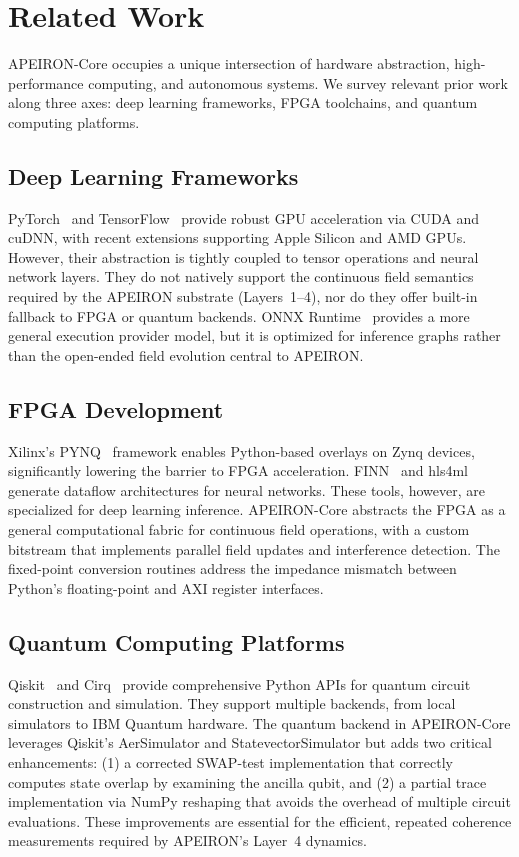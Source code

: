 \newpage
\section{Related Work}

APEIRON-Core occupies a unique intersection of hardware abstraction, high-performance computing, and autonomous systems. We survey relevant prior work along three axes: deep learning frameworks, FPGA toolchains, and quantum computing platforms.

\subsection{Deep Learning Frameworks}
PyTorch~\cite{paszke2019pytorch} and TensorFlow~\cite{abadi2016tensorflow} provide robust GPU acceleration via CUDA and cuDNN, with recent extensions supporting Apple Silicon and AMD GPUs. However, their abstraction is tightly coupled to tensor operations and neural network layers. They do not natively support the continuous field semantics required by the APEIRON substrate (Layers~1–4), nor do they offer built-in fallback to FPGA or quantum backends. ONNX Runtime~\cite{onnxruntime2024} provides a more general execution provider model, but it is optimized for inference graphs rather than the open-ended field evolution central to APEIRON.

\subsection{FPGA Development}
Xilinx's PYNQ~\cite{pynq2024} framework enables Python-based overlays on Zynq devices, significantly lowering the barrier to FPGA acceleration. FINN~\cite{blott2018finn} and hls4ml~\cite{duarte2018hls4ml} generate dataflow architectures for neural networks. These tools, however, are specialized for deep learning inference. APEIRON-Core abstracts the FPGA as a general computational fabric for continuous field operations, with a custom bitstream that implements parallel field updates and interference detection. The fixed-point conversion routines address the impedance mismatch between Python's floating-point and AXI register interfaces.

\subsection{Quantum Computing Platforms}
Qiskit~\cite{qiskit2023} and Cirq~\cite{cirq2024} provide comprehensive Python APIs for quantum circuit construction and simulation. They support multiple backends, from local simulators to IBM Quantum hardware. The quantum backend in APEIRON-Core leverages Qiskit's AerSimulator and StatevectorSimulator but adds two critical enhancements: (1) a corrected SWAP-test implementation that correctly computes state overlap by examining the ancilla qubit, and (2) a partial trace implementation via NumPy reshaping that avoids the overhead of multiple circuit evaluations. These improvements are essential for the efficient, repeated coherence measurements required by APEIRON's Layer~4 dynamics.

